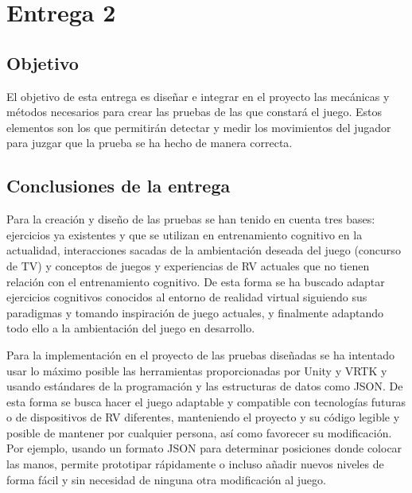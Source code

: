 \section{Entrega 2}


\subsection{Objetivo}

El objetivo de esta entrega es diseñar e integrar en el proyecto las mecánicas y métodos necesarios para crear las pruebas de las que constará el juego. Estos elementos son los que permitirán detectar y medir los movimientos del jugador para juzgar que la prueba se ha hecho de manera correcta.











\subsection{Conclusiones de la entrega}


Para la creación y diseño de las pruebas se han tenido en cuenta tres bases: ejercicios ya existentes y que se utilizan en entrenamiento cognitivo en la actualidad, interacciones sacadas de la ambientación deseada del juego (concurso de TV) y conceptos de juegos y experiencias de RV actuales que no tienen relación con el entrenamiento cognitivo.
De esta forma se ha buscado adaptar ejercicios cognitivos conocidos al entorno de realidad virtual siguiendo sus paradigmas y tomando inspiración de juego actuales, y finalmente adaptando todo ello a la ambientación del juego en desarrollo. 

Para la implementación en el proyecto de las pruebas diseñadas se ha intentado usar lo máximo posible las herramientas proporcionadas por Unity y VRTK y usando estándares de la programación y las estructuras de datos como JSON. De esta forma se busca hacer el juego adaptable y compatible con tecnologías futuras o de dispositivos de RV diferentes, manteniendo el proyecto y su código legible y posible de mantener por cualquier persona, así como favorecer su modificación. Por ejemplo, usando un formato JSON para determinar posiciones donde colocar las manos, permite prototipar rápidamente o incluso añadir nuevos niveles de forma fácil y sin necesidad de ninguna otra modificación al juego.

